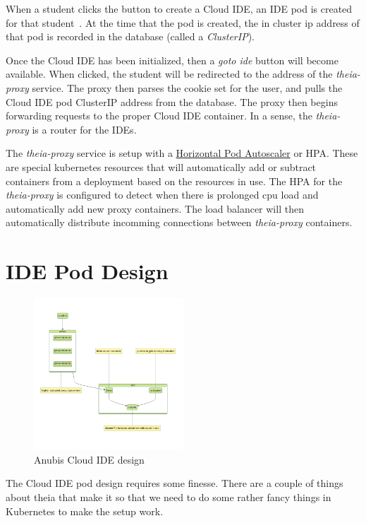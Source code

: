 When a student clicks the button to create a Cloud IDE, 
an IDE pod is created for that student~.
At the time that the pod is created, the in cluster ip address
of that pod is recorded in the database (called a \textit{ClusterIP}).

Once the Cloud IDE has been initialized, then a \textit{goto ide} button
will become available.
When clicked, the student will be redirected to the address of the \textit{theia-proxy} service.
The proxy then parses the cookie set for the user, and pulls the
Cloud IDE pod ClusterIP address from the database.
The proxy then begins forwarding requests to the proper Cloud IDE container.
In a sense, the \textit{theia-proxy} is a router for the IDEs.

The \textit{theia-proxy} service is setup with a 
\href{https://kubernetes.io/docs/tasks/run-application/horizontal-pod-autoscale/}{Horizontal Pod Autoscaler} or HPA.
These are special kubernetes resources that will automatically add or subtract containers
from a deployment based on the resources in use.
The HPA for the \textit{theia-proxy} is configured to detect when 
there is prolonged cpu load and automatically add new proxy containers.
The load balancer will then automatically distribute incomming connections
between \textit{theia-proxy} containers.

\section{IDE Pod Design}\label{sec:ide-pod-design}

\begin{figure}[ht]
    \centering
    \includegraphics[width=0.5\textwidth]{figures/theia-pod.mmd}
    \caption{Anubis Cloud IDE design\label{fig:anubis-ide}}
\end{figure}

The Cloud IDE pod design requires some finesse. 
There are a couple of things about theia that make it so that
we need to do some rather fancy things in Kubernetes to make 
the setup work.

